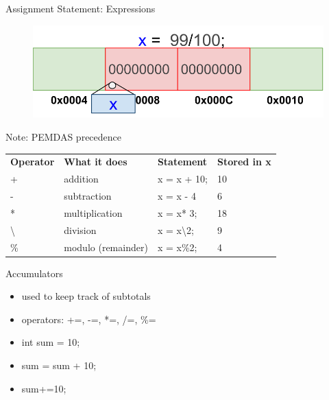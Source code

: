 \documentclass[xcolor={dvipsnames}]{beamer}
\begin{document}
\begin{frame}{Assignment Statement: Expressions}
\begin{figure}
	\includegraphics[width=1\textwidth]{expr}
\end{figure}

\begin{block}{Note: PEMDAS precedence}
	\begin{tabularx}{\textwidth}{X X X X}
		\textbf{Operator} & \textbf{What it does} & \textbf{Statement} & \textbf{Stored in x}\\

		+ & addition & x = x + 10; & 10 \\
		- & subtraction & x = x - 4 & 6 \\
		*& multiplication & x = x* 3; &  18 \\
		\textbackslash & division & x = x\textbackslash2; & 9 \\
		\% & modulo (remainder) &  x = x\%2; & 4 \\  
	\end{tabularx}
\end{block}
\end{frame}

\begin{frame}{Accumulators}
	\begin{block}{}
		\begin{itemize}
		\item used to keep track of subtotals
		\item operators: +=, -=, *=, /=, \%=
		\end{itemize}
	\end{block}
	
	\begin{block}{}
		\begin{itemize}
			\item int sum = 10;
			\item sum = sum + 10;
			\item sum+=10;
		\end{itemize}
	\end{block}
\end{frame}
\end{document}
